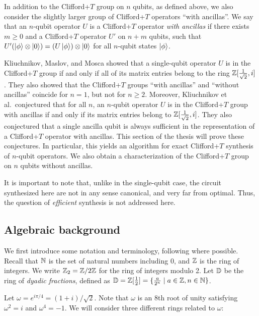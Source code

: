 In addition to the Clifford+$T$ group on $n$ qubits, as defined above, we also consider the
slightly larger group of Clifford+$T$ operators ``with ancillas''. We say that an $n$-qubit
operator $U$ is a Clifford+$T$ operator {\em with ancillas} if there exists $m\geq 0$ and a
Clifford+$T$ operator $U'$ on $n+m$ qubits, such that $U'(\left\vert{\phi}\right\rangle\otimes\left\vert{0}\right\rangle)=
(U\left\vert{\phi}\right\rangle)\otimes\left\vert{0}\right\rangle$ for all $n$-qubit states $\left\vert{\phi}\right\rangle$.

Kliuchnikov, Maslov, and Mosca {\cite{Kliuchnikov-et-al}} showed that a single-qubit operator $U$
is in the Clifford+$T$ group if and only if all of its matrix entries belong to the ring
$\mathbb{Z}[\frac1{\sqrt{2}},i]$. They also showed that the Clifford+$T$ groups ``with ancillas'' and
``without ancillas'' coincide for $n=1$, but not for $n\geq 2$. Moreover, Kliuchnikov et
al.~conjectured that for all $n$, an $n$-qubit operator $U$ is in the Clifford+$T$ group with
ancillas if and only if its matrix entries belong to $\mathbb{Z}[\frac1{\sqrt{2}},i]$. They also
conjectured that a single ancilla qubit is always sufficient in the representation of a
Clifford+$T$ operator with ancillas. This section of the thesis will prove these conjectures. In
particular, this yields an algorithm for exact Clifford+$T$ synthesis of $n$-qubit operators. We
also obtain a characterization of the Clifford+$T$ group on $n$ qubits without ancillas.

It is important to note that, unlike in the single-qubit case, the circuit synthesized here are not
in any sense canonical, and very far from optimal. Thus, the question of {\em efficient} synthesis
is not addressed here.

\subsection{Algebraic background} %
\label{sub:algebraic_background}
We first introduce some notation and terminology, following {\cite{Kliuchnikov-et-al}} where
possible. Recall that $\mathbb{N}$ is the set of natural numbers including 0, and $\mathbb{Z}$ is the ring of
\linebreak integers. We write $\mathbb{Z}_2=\mathbb{Z}/2\mathbb{Z}$ for the ring of integers modulo 2. Let $\mathbb{D}$ be the ring
of {\em dyadic fractions}, defined as $\mathbb{D} = \mathbb{Z}[\frac12] = \{\frac{a}{2^n}\mid a\in\mathbb{Z}, n\in\mathbb{N}\}$.

Let $\omega = e^{i\pi/4} = (1+i)/\sqrt{2}$. Note that $\omega$ is an 8th root of unity satisfying
$\omega^2=i$ and $\omega^4=-1$. We will consider three different rings related to $\omega$:

